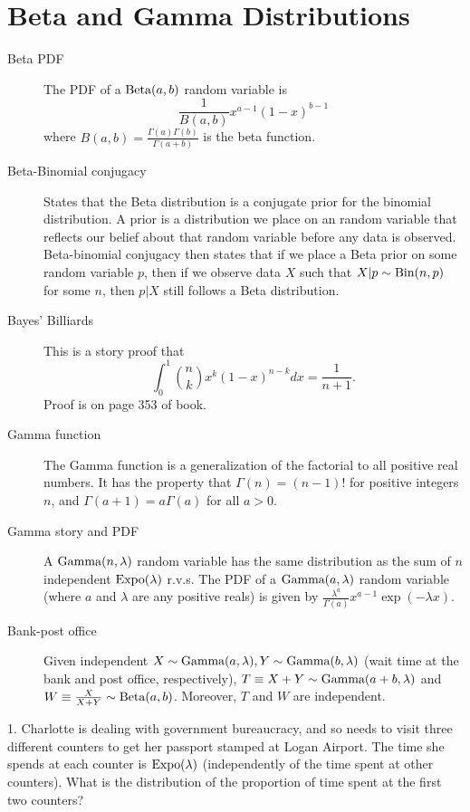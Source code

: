 \documentclass{article}
\begin{document}
 

\header

\section{Beta and Gamma Distributions}

\begin{description}
    \item[Beta PDF] The PDF of a $\textrm{Beta}(a, b)$ random variable is $$\frac{1}{B(a, b)}x^{a - 1}(1 - x)^{b - 1}$$
    where $B(a, b) = \frac{\Gamma(a)\Gamma(b)}{\Gamma(a + b)}$ is the beta function.
    
    \item[Beta-Binomial conjugacy] States that the Beta distribution is a conjugate prior for the binomial distribution. A prior is a distribution we place on an random variable that reflects our belief about that random variable before any data is observed. Beta-binomial conjugacy then states that if we place a Beta prior on some random variable $p$, then if we observe data $X$ such that $X|p \sim \textrm{Bin}(n,p)$ for some $n$, then $p|X$ still follows a Beta distribution. 
    
    \item [Bayes' Billiards] This is a story proof that 
    $$\int_0^1\binom{n}{k}x^k(1 - x)^{n - k}dx = \frac{1}{n + 1}.$$
    Proof is on page 353 of book.
    
    \item[Gamma function] The Gamma function is a generalization of the factorial to all positive real numbers. It has the property that $\Gamma(n) = (n-1)!$ for positive integers $n$, and $\Gamma(a+1)=a\Gamma(a)$ for all $a > 0$. 
    
    \item[Gamma story and PDF] A $\textrm{Gamma}(n, \lambda)$ random variable has the same distribution as the sum of $n$ independent $\textrm{Expo}(\lambda)$ r.v.s. The PDF of a $\textrm{Gamma}(a,\lambda)$ random variable (where $a$ and $\lambda$ are any positive reals) is given by 
    $\frac{\lambda^a}{\Gamma(a)} x^{a-1}\exp(-\lambda x)$.
    
    \item[Bank-post office] Given independent $X \sim \textrm{Gamma}(a, \lambda), Y \sim \textrm{Gamma}(b, \lambda)$ (wait time at the bank and post office, respectively), $T \equiv X + Y \sim \textrm{Gamma}(a + b, \lambda)$ and $W \equiv \frac{X}{X + Y} \sim \textrm{Beta}(a, b)$. Moreover, $T$ and $W$ are independent.
\end{description}
1. Charlotte is dealing with government bureaucracy, and so needs to visit three different counters to get her passport stamped at Logan Airport. The time she spends at each counter is $\textrm{Expo}(\lambda)$ (independently of the time spent at other counters). What is the distribution of the proportion of time spent at the first two counters?
\end{document}
